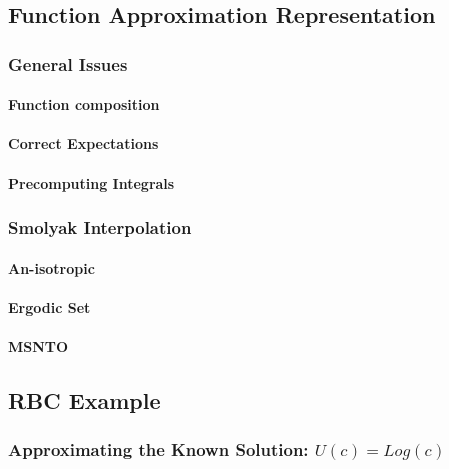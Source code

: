 \documentclass[12pt]{article}
\begin{document}
\subsection{Function Approximation Representation}
\label{sec:funcApproxRep}

\subsubsection{General Issues}
\label{sec:generalissues}

\paragraph{Function composition}



\paragraph{Correct Expectations}

\paragraph{Precomputing Integrals}


\subsubsection{Smolyak Interpolation}
\label{sec:smolyakinterp}

\paragraph{An-isotropic}

\paragraph{Ergodic Set}
\paragraph{MSNTO}

\subsection{RBC Example}
\label{sec:rbc-example}


\subsubsection{Approximating the Known Solution: $U(c) = Log(c)$ }
\label{sec:recov-known-solut}
\end{document}
